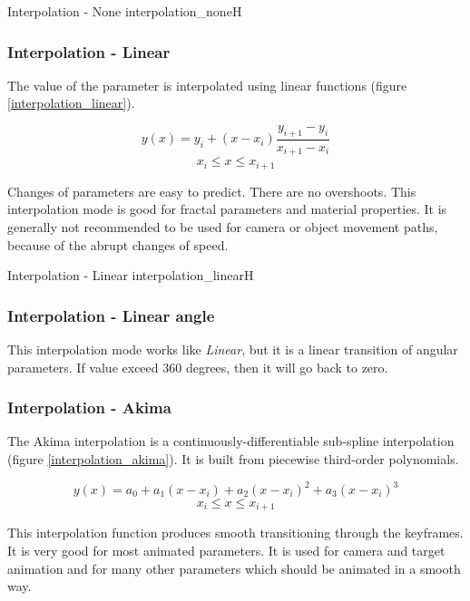{Interpolation - None}
{interpolation_none}{H}

\subsubsection{Interpolation - Linear}\label{interpolation-linear}

The value of the parameter is interpolated using linear functions (figure \ref{interpolation_linear}).

\[ y(x) = y_i + (x - x_i) \frac{y_{i+1} - y_i}{x_{i+1} - x_i}\] \[x_i  \leq x
\leq x_{i+1}\]

Changes of parameters are easy to predict. There are no overshoots. This
interpolation mode is good for fractal parameters and material properties. It is
generally not recommended to be used for camera or object movement paths, because of the abrupt changes of speed.

{Interpolation - Linear}
{interpolation_linear}{H}

\subsubsection{Interpolation - Linear angle}\label{interpolation-linear-angle}

This interpolation mode works like \emph{Linear}, but it is a linear transition of angular
parameters. If value exceed 360 degrees, then it will go back to zero.

\subsubsection{Interpolation - Akima}\label{interpolation-akima}

The Akima interpolation is a continuously-differentiable sub-spline
interpolation (figure \ref{interpolation_akima}). It is built from piecewise third-order polynomials.

\[ y(x) = a_0 + a_1 (x - x_i) + a_2 (x - x_i)^2 + a_3 (x - x_i)^3\] \[x_i  \leq
x \leq x_{i+1}\]

This interpolation function produces smooth transitioning through the keyframes. It is very good for most animated parameters. It 
is used for camera and target animation and for many other parameters which
should be animated in a smooth way.

